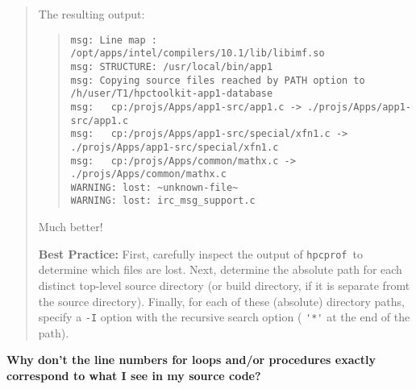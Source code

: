 \documentclass{article}
\newcommand{\hpcprof}{\texttt{hpcprof}}
\begin{document}
\begin{quote}
The resulting output:
\begin{quote}
\begin{Verbatim}[fontsize=\small]
msg: Line map : /opt/apps/intel/compilers/10.1/lib/libimf.so
msg: STRUCTURE: /usr/local/bin/app1
msg: Copying source files reached by PATH option to /h/user/T1/hpctoolkit-app1-database
msg:   cp:/projs/Apps/app1-src/app1.c -> ./projs/Apps/app1-src/app1.c
msg:   cp:/projs/Apps/app1-src/special/xfn1.c -> ./projs/Apps/app1-src/special/xfn1.c
msg:   cp:/projs/Apps/common/mathx.c -> ./projs/Apps/common/mathx.c
WARNING: lost: ~unknown-file~
WARNING: lost: irc_msg_support.c
\end{Verbatim}
\end{quote}
\nobreak Much better!


\textbf{Best Practice:} First, carefully inspect the output of \hpcprof\ to
determine which files are lost. Next, determine the absolute path for
each distinct top-level source directory (or build directory, if it 
is separate fromt the source directory). Finally, for each of these (absolute) directory paths,
specify a \verb|-I| option with the recursive search option ( \verb|'*'| at the end
of the path).

\end{quote}

\begin{comment}
   possible question: What happens if I forget to run hpcstruct?  
No hpcstruct = 
   really crazy procedure & loop bounds
   no inlining detection!
\end{comment}

\textbf{Why don't the line numbers for loops and/or procedures exactly
correspond to what I see in my source code?}
\end{document}
